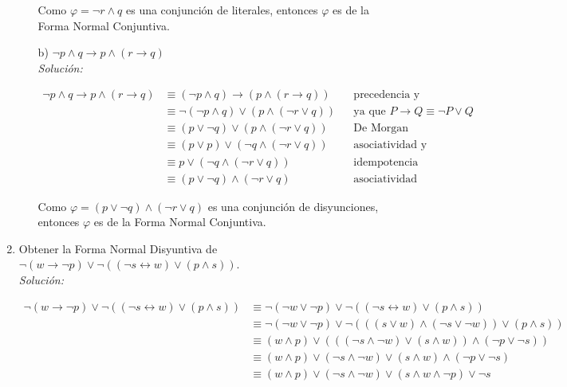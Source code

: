 \documentclass[letterpaper,10pt]{article}
\begin{document}
\begin{enumerate}
\begin{itemize}
            Como $\varphi = \neg r \land q$ es una conjunción de literales, 
            entonces $\varphi$ es de la Forma Normal Conjuntiva.

            \item[b)] $\neg p \land q \rightarrow p \land (r \rightarrow q)$ \\
            \textit{Solución:} 

            \begin{align*}
                \neg p \land q \rightarrow p \land (r \rightarrow q)
                &\equiv (\neg p \land q) \rightarrow (p \land (r \rightarrow q))
                && \text{precedencia y asociatividad de conectivos} \\
                &\equiv \neg (\neg p \land q) \lor (p \land (\neg r \lor q))
                && \text{{ya que $P \rightarrow Q \equiv \neg P \lor Q$}} \\
                &\equiv (p \lor \neg q) \lor (p \land (\neg r \lor q))
                && \text{De Morgan} \\
                &\equiv (p \lor p) \lor (\neg q \land (\neg r \lor q))
                && \text{asociatividad y conmutatividad} \\
                &\equiv p \lor (\neg q \land (\neg r \lor q))
                && \text{idempotencia} \\
                &\equiv (p \lor \neg q) \land (\neg r \lor q)
                && \text{asociatividad}
            \end{align*}

            Como $\varphi =  (p \lor \neg q) \land (\neg r \lor q)$ es una 
            conjunción de disyunciones, entonces $\varphi$ es de la Forma 
            Normal Conjuntiva. 
        \end{itemize}

        \item Obtener la Forma Normal Disyuntiva de 
        $\neg (w \rightarrow \neg p) \lor \neg ((\neg s \leftrightarrow w) 
        \lor (p \land s))$. \\
        \textit{Solución:} 

        \begin{align*}
            \neg (w \rightarrow \neg p) \lor \neg ((\neg s \leftrightarrow w) 
            \lor (p \land s))
            &\equiv \neg (\neg w \lor \neg p) \lor 
            \neg ((\neg s \leftrightarrow w) \lor (p \land s)) \\
            &\equiv \neg (\neg w \lor \neg p) \lor 
            \neg (((s \lor w) \land (\neg s \lor \neg w)) \lor (p \land s)) \\
            &\equiv (w \land p) \lor (((\neg s \land \neg w) \lor 
            (s \land w)) \land (\neg p \lor \neg s)) \\
            &\equiv (w \land p) \lor (\neg s \land \neg w) \lor (s \land w)
            \land (\neg p \lor \neg s) \\
            &\equiv (w \land p) \lor (\neg s \land \neg w) \lor (s \land w
            \land \neg p) \lor \neg s
        \end{align*}


\end{enumerate}
\end{document}
